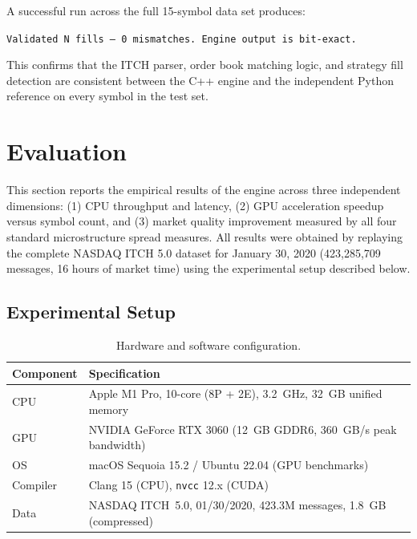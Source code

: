 \documentclass[12pt]{article}
\begin{document}
A successful run across the full 15-symbol data set produces:

\begin{center}
\texttt{Validated N fills --- 0 mismatches. Engine output is bit-exact.}
\end{center}

This confirms that the ITCH parser, order book matching logic, and
strategy fill detection are consistent between the C++ engine and the
independent Python reference on every symbol in the test set.

\newpage

\section{Evaluation}
\label{sec:eval}

This section reports the empirical results of the engine across three
independent dimensions: (1) CPU throughput and latency, (2) GPU
acceleration speedup versus symbol count, and (3) market quality
improvement measured by all four standard microstructure spread measures.
All results were obtained by replaying the complete NASDAQ ITCH 5.0
dataset for January 30, 2020 (423,285,709 messages, 16 hours of market
time) using the experimental setup described below.

\subsection{Experimental Setup}
\label{sec:eval:setup}

\begin{table}[H]
\centering
\small
\caption{Hardware and software configuration.}
\label{tab:hw}
\begin{tabularx}{\linewidth}{@{}lX@{}}
\toprule
\textbf{Component} & \textbf{Specification} \\
\midrule
CPU  & Apple M1 Pro, 10-core (8P + 2E), 3.2~GHz, 32~GB unified memory \\
GPU  & NVIDIA GeForce RTX 3060 (12~GB GDDR6, 360~GB/s peak bandwidth) \\
OS   & macOS Sequoia 15.2 / Ubuntu 22.04 (GPU benchmarks) \\
Compiler & Clang 15 (CPU), \texttt{nvcc} 12.x (CUDA) \\
Data & NASDAQ ITCH~5.0, 01/30/2020, 423.3M messages, 1.8~GB (compressed) \\
\bottomrule
\end{tabularx}
\end{table}
\end{document}
